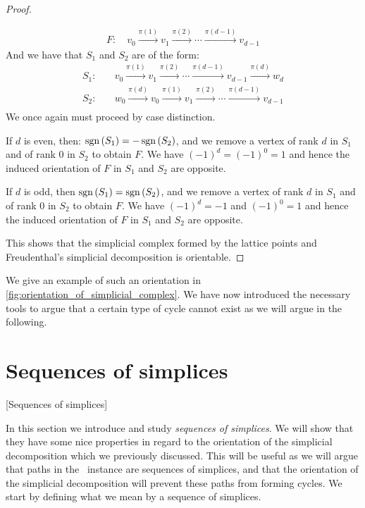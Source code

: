 \begin{proof}
\begin{case}{2}
		\begin{align*}
			F: \quad v_0 \xrightarrow{\pi(1)} v_1 \xrightarrow{\pi(2)} \cdots  \xrightarrow{\pi(d-1)} v_{d-1}
		\end{align*}
		And we have that $S_1$ and $S_2$ are of the form:
		\begin{align*}
			S_1: & \quad v_0 \xrightarrow{\pi(1)} v_1 \xrightarrow{\pi(2)} \cdots \xrightarrow{\pi(d-1)} v_{d-1} \xrightarrow{\pi(d)} w_d \\
			S_2: & \quad w_0 \xrightarrow{\pi(d)} v_0 \xrightarrow{\pi(1)} v_1 \xrightarrow{\pi(2)} \cdots \xrightarrow{\pi(d-1)} v_{d-1} \\
		\end{align*}
		We once again must proceed by case distinction.
		\begin{case}{2.1}
			If $d$ is even, then: $\operatorname{sgn}\left(S_1\right) = - \operatorname{sgn}\left(S_2\right)$, and we remove a vertex of rank $d$ in $S_1$ and of rank $0$ in $S_2$ to obtain $F$. We have $(-1)^d = (-1)^0 = 1$ and hence the induced orientation of $F$ in $S_1$ and $S_2$ are opposite.
		\end{case}
		\begin{case}{2.2}
			If $d$ is odd, then $\operatorname{sgn}\left(S_1\right) = \operatorname{sgn}\left(S_2\right)$, and we remove a vertex of rank $d$ in $S_1$ and of rank $0$ in $S_2$ to obtain $F$. We have $(-1)^d = -1$ and $(-1)^0 = 1$ and hence the induced orientation of $F$ in $S_1$ and $S_2$ are opposite.
		\end{case}
	\end{case}
	This shows that the simplicial complex formed by the lattice points and Freudenthal's simplicial decomposition is orientable.
\end{proof}

We give an example of such an orientation in \cref{fig:orientation_of_simplicial_complex}. We have now introduced the necessary tools to argue that a certain type of cycle cannot exist as we will argue in the following.

\section{Sequences of simplices}[Sequences of simplices]

In this section we introduce and study \emph{sequences of simplices}. We will show that they have some nice properties in regard to the orientation of the simplicial decomposition which we previously discussed. This will be useful as we will argue that paths in the \EndOfLine\ instance are sequences of simplices, and that the orientation of the simplicial decomposition will prevent these paths from forming cycles. We start by defining what we mean by a sequence of simplices.

